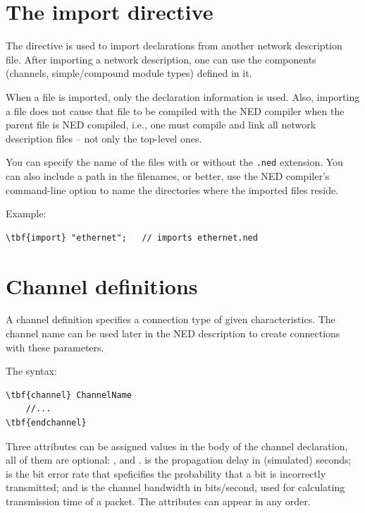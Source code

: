 \section{The import directive}


The  directive
is used to import declarations from another network description file.
After importing a network description, one can use the components
(channels, simple/compound module types) defined in it.

When a file is imported, only the declaration information is used.
Also, importing a  file does not cause that file to be compiled
with the NED compiler when the parent file is NED compiled, i.e.,
one must compile and link all network description files --
not only the top-level ones.

You can specify the name of the files with or without the
\texttt{.ned} extension. You can also include a path in the
filenames, or better, use the NED compiler's
 command-line option to name the directories where the
imported files reside.

Example:

\begin{Verbatim}[commandchars=\\\{\}]
\tbf{import} "ethernet";   // imports ethernet.ned
\end{Verbatim}




\section{Channel definitions}


A channel definition specifies a connection type of given characteristics.
The channel name can be used later in the NED description to
create connections with these parameters.

The syntax:

\begin{Verbatim}[commandchars=\\\{\}]
\tbf{channel} ChannelName
    //...
\tbf{endchannel}
\end{Verbatim}

Three attributes can be assigned values in the body of the channel declaration,
all of them are optional: ,  and .
 is the propagation delay in (simulated) seconds;
 is the bit error rate that speficifies the probability
that a bit is incorrectly transmitted; and 
is the channel bandwidth in bits/second, used for calculating
transmission time of a packet. The attributes can appear
in any order.

